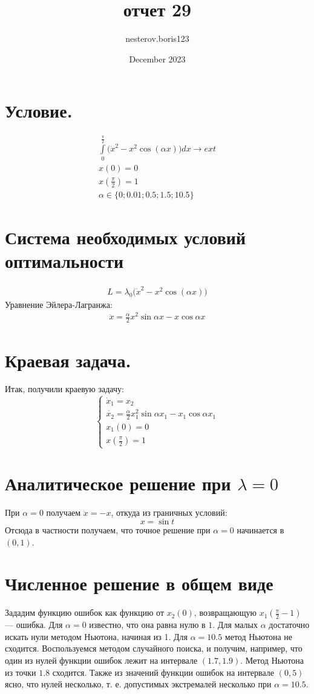 \documentclass{article}
\title{отчет 29}
\author{nesterov.boris123 }
\date{December 2023}
\begin{document}
\section{Условие.}
\begin{gather*}
 \int\limits_{0}^{\frac{\pi} 2}\big(\dot{x}^{2} - x^{2}\cos(\alpha x)\big)dx \rightarrow ext\\
  x(0) = 0\\
  x(\frac{\pi} 2) = 1\\
  \alpha \in \{0;0.01;0.5;1.5;10.5\}
\end{gather*}
\section{Система необходимых условий оптимальности}
\begin{gather*}
  L = \lambda_{0}\big(\dot{x}^{2} - x^{2}\cos(\alpha x)\big)
\end{gather*}
Уравнение Эйлера-Лагранжа:
\begin{gather*}
  \ddot{x} = \frac{\alpha}{2} x^{2}\sin\alpha x - x \cos \alpha x
\end{gather*}
\section{Краевая задача.}
Итак, получили краевую задачу:
$$\begin{cases}
  \dot x_{1} = x_{2}\\
  \dot{x_{2}} = \frac{\alpha}{2} x_{1}^{2}\sin\alpha x_{1} - x_{1} \cos \alpha x_{1}\\
  x_1(0) = 0\\
  x(\frac{\pi} 2) = 1
\end{cases}$$
\section{Аналитическое решение при $\lambda = 0$}
При $\alpha = 0$ получаем $\ddot{x} = -x$, откуда из граничных условий:
\[x = \sin t\]
Отсюда в частности получаем, что точное решение при $\alpha = 0$ начинается в $(0,1)$.
\section{Численное решение в общем виде}
Зададим функцию ошибок как функцию от $x_{2}(0)$, возвращающую $x_{1}(\frac{\pi}{2}-1)$ --- ошибка.
Для $\alpha = 0$ известно, что она равна нулю в $1$. Для малых $\alpha$ достаточно искать нули
 методом Ньютона, начиная из 1. Для $\alpha = 10.5$ метод Ньютона не
 сходится. Воспользуемся методом случайного поиска, и получим, например, что один из нулей функции ошибок лежит на
 интервале $(1.7, 1.9)$. Метод Ньютона из точки $1.8$ сходится. Также из значений функции ошибок на интервале $(0, 5)$
 ясно, что нулей несколько, т. е. допустимых экстремалей несколько при $\alpha = 10.5$.
\end{document}
